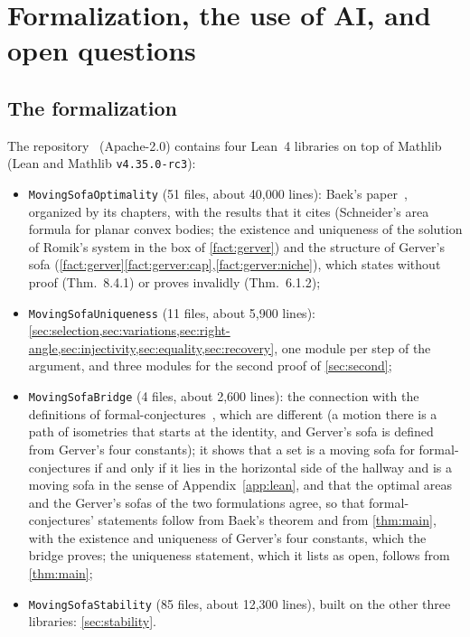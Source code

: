 \section{Formalization, the use of AI, and open questions}\label{sec:formalization}

\subsection{The formalization}

The repository~\cite{Companion} (Apache-2.0) contains four Lean~4 libraries on
top of Mathlib (Lean and Mathlib \texttt{v4.35.0-rc3}):
\begin{itemize}
\item \texttt{MovingSofaOptimality} (51 files, about 40,000 lines): Baek's
paper~\cite{Baek}, organized by its chapters, with the results that it cites
(Schneider's area formula for planar convex bodies; the existence and uniqueness
of the solution of Romik's system in the box of \cref{fact:gerver}) and the
structure of Gerver's sofa
(\cref{fact:gerver}\ref{fact:gerver:cap},\ref{fact:gerver:niche}), which
\cite{Baek} states without proof (Thm.~8.4.1) or proves invalidly (Thm.~6.1.2);
\item \texttt{MovingSofaUniqueness} (11 files, about 5,900 lines):
\cref{sec:selection,sec:variations,sec:right-angle,sec:injectivity,sec:equality,sec:recovery},
one module per step of the argument, and three modules for the second proof of
\cref{sec:second};
\item \texttt{MovingSofaBridge} (4 files, about 2,600 lines): the connection
with the definitions of formal-conjectures~\cite{FormalConjectures}, which are
different (a motion there is a path of isometries that starts at the identity,
and Gerver's sofa is defined from Gerver's four constants); it shows that a set
is a moving sofa for formal-conjectures if and only if it lies in the horizontal
side of the hallway and is a moving sofa in the sense of
Appendix~\ref{app:lean}, and that the optimal areas and the Gerver's sofas of
the two formulations agree, so that formal-conjectures' statements follow from
Baek's theorem and from \cref{thm:main}, with the existence and uniqueness of
Gerver's four constants, which the bridge proves; the uniqueness statement,
which it lists as open, follows from \cref{thm:main};
\item \texttt{MovingSofaStability} (85 files, about 12,300 lines), built on the
other three libraries: \cref{sec:stability}.
\end{itemize}
